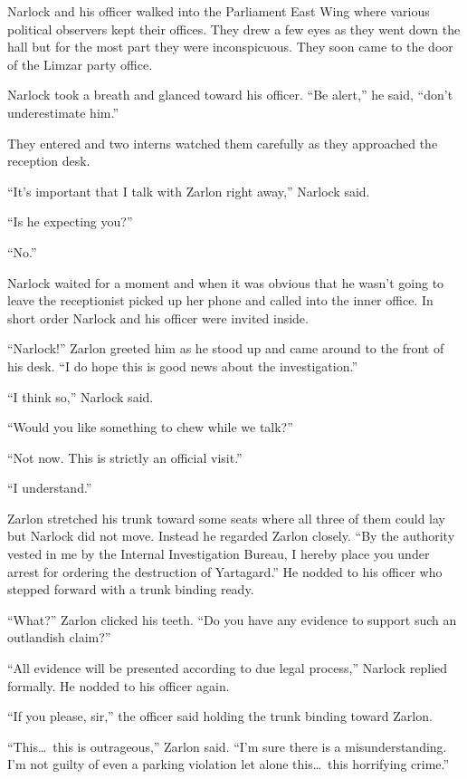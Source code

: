 
Narlock and his officer walked into the Parliament East Wing where various political observers
kept their offices. They drew a few eyes as they went down the hall but for the most part they
were inconspicuous. They soon came to the door of the Limzar party office.

Narlock took a breath and glanced toward his officer. ``Be alert,'' he said, ``don't
underestimate him.''

They entered and two interns watched them carefully as they approached the reception desk.

``It's important that I talk with Zarlon right away,'' Narlock said.

``Is he expecting you?''

``No.''

Narlock waited for a moment and when it was obvious that he wasn't going to leave the
receptionist picked up her phone and called into the inner office. In short order Narlock and
his officer were invited inside.

``Narlock!'' Zarlon greeted him as he stood up and came around to the front of his desk. ``I do
hope this is good news about the investigation.''

``I think so,'' Narlock said.

``Would you like something to chew while we talk?''

``Not now. This is strictly an official visit.''

``I understand.''

Zarlon stretched his trunk toward some seats where all three of them could lay but Narlock did
not move. Instead he regarded Zarlon closely. ``By the authority vested in me by the Internal
Investigation Bureau, I hereby place you under arrest for ordering the destruction of
Yartagard.'' He nodded to his officer who stepped forward with a trunk binding ready.

``What?'' Zarlon clicked his teeth. ``Do you have any evidence to support such an outlandish
claim?''

``All evidence will be presented according to due legal process,'' Narlock replied formally. He
nodded to his officer again.

``If you please, sir,'' the officer said holding the trunk binding toward Zarlon.

``This\ldots\ this is outrageous,'' Zarlon said. ``I'm sure there is a misunderstanding. I'm not
guilty of even a parking violation let alone this\ldots\ this horrifying crime.''

